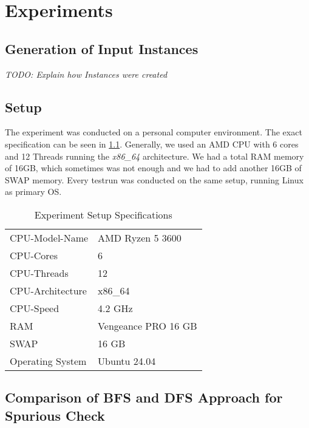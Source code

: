 \chapter{Experiments}

\section{Generation of Input Instances}
\textit{TODO: Explain how Instances were created}

\section{Setup}
The experiment was conducted on a personal computer environment. The exact specification can be seen in \cref{table:ExperimentSpecs}. Generally, we used an AMD CPU with 6 cores and 12 Threads running the \textit{x86\_64} architecture. We had a total RAM memory of 16GB, which sometimes was not enough and we had to add another 16GB of SWAP memory. Every testrun was conducted on the same setup, running Linux as primary OS.

\begin{table}[H]
    \centering
    \caption{Experiment Setup Specifications}
    \begin{tabular}{ |l|l| }
     \hline
     CPU-Model-Name & AMD Ryzen 5 3600\\
     CPU-Cores & 6\\
     CPU-Threads & 12\\
     CPU-Architecture & x86\_64\\
     CPU-Speed & 4.2 GHz\\
     RAM & Vengeance PRO 16 GB\\
     SWAP & 16 GB\\
     Operating System & Ubuntu 24.04 \\
     \hline
    \end{tabular}
\label{table:ExperimentSpecs}
\end{table}




\section{Comparison of BFS and DFS Approach for Spurious Check}


